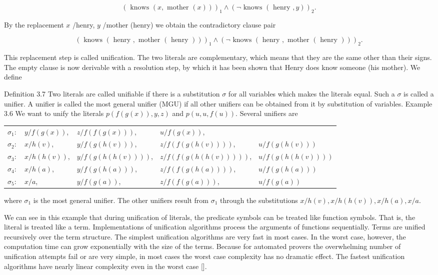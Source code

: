 \documentclass[10pt]{book}
\begin{document}
$$
(\text { knows }(x, \text { mother }(x)))_{1} \wedge(\neg \text { knows }(\text { henry }, y))_{2} .
$$

By the replacement $x$ /henry, $y$ /mother (henry) we obtain the contradictory clause pair

$$
(\text { knows }(\text { henry }, \text { mother }(\text { henry })))_{1} \wedge(\neg \text { knows }(\text { henry }, \text { mother }(\text { henry })))_{2} .
$$

This replacement step is called unification. The two literals are complementary, which means that they are the same other than their signs. The empty clause is now derivable with a resolution step, by which it has been shown that Henry does know someone (his mother). We define

Definition 3.7 Two literals are called unifiable if there is a substitution $\sigma$ for all variables which makes the literals equal. Such a $\sigma$ is called a unifier. A unifier is called the most general unifier (MGU) if all other unifiers can be obtained from it by substitution of variables.
Example 3.6 We want to unify the literals $p(f(g(x)), y, z)$ and $p(u, u, f(u))$. Several unifiers are

\begin{center}
\begin{tabular}{lllll}
$\sigma_{1}:$ & $y / f(g(x))$, & $z / f(f(g(x)))$, & $u / f(g(x))$, &  \\
$\sigma_{2}:$ & $x / h(v)$, & $y / f(g(h(v)))$, & $z / f(f(g(h(v))))$, & $u / f(g(h(v)))$ \\
$\sigma_{3}:$ & $x / h(h(v))$, & $y / f(g(h(h(v))))$, & $z / f(f(g(h(h(v)))))$, & $u / f(g(h(h(v))))$ \\
$\sigma_{4}:$ & $x / h(a)$, & $y / f(g(h(a)))$, & $z / f(f(g(h(a))))$, & $u / f(g(h(a)))$ \\
$\sigma_{5}:$ & $x / a$, & $y / f(g(a))$, & $z / f(f(g(a)))$, & $u / f(g(a))$ \\
\end{tabular}
\end{center}

where $\sigma_{1}$ is the most general unifier. The other unifiers result from $\sigma_{1}$ through the substitutions $x / h(v), x / h(h(v)), x / h(a), x / a$.

We can see in this example that during unification of literals, the predicate symbols can be treated like function symbols. That is, the literal is treated like a term. Implementations of unification algorithms process the arguments of functions sequentially. Terms are unified recursively over the term structure. The simplest unification algorithms are very fast in most cases. In the worst case, however, the computation time can grow exponentially with the size of the terms. Because for automated provers the overwhelming number of unification attempts fail or are very simple, in most cases the worst case complexity has no dramatic effect. The fastest unification algorithms have nearly linear complexity even in the worst case [\cite{bib82}].
\end{document}
